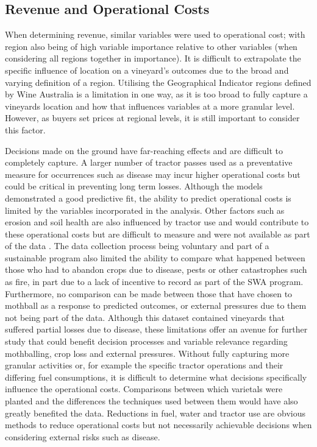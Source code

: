 \documentclass[review,12pt,authoryear]{elsarticle}
\begin{document}
\begin{linenumbers}

\subsection{Revenue and Operational Costs}

When determining revenue, similar variables were used to operational cost; with region also being of high variable importance relative to other variables (when considering all regions together in importance). It is difficult to extrapolate the specific influence of location on a vineyard's outcomes due to the broad and varying definition of a region. Utilising the Geographical Indicator regions defined by Wine Australia \citep{australiaWineAustraliaOpenData2021} is a limitation in one way, as it is too broad to fully capture a vineyards location and how that influences variables at a more granular level. However, as buyers set prices at regional levels, it is still important to consider this factor. 
\par
Decisions made on the ground have far-reaching effects and are difficult to completely capture. A larger number of tractor passes used as a preventative measure for occurrences such as disease may incur higher operational costs but could be critical in preventing long term losses. Although the models demonstrated a good predictive fit, the ability to predict operational costs is limited by the variables incorporated in the analysis. Other factors such as erosion and soil health are also influenced by tractor use and would contribute to these operational costs but are difficult to measure and were not available as part of the data \citep{capelloEffectsTractorPasses2019,capelloPermanentCoverSoil2020}. The data collection process being voluntary and part of a sustainable program also limited the ability to compare what happened between those who had to abandon crops due to disease, pests or other catastrophes such as fire, in part due to a lack of incentive to record as part of the SWA program. Furthermore, no comparison can be made between those that have chosen to mothball as a response to predicted outcomes, or external pressures due to them not being part of the data. Although this dataset contained vineyards that suffered partial losses due to disease, these limitations offer an avenue for further study that could benefit decision processes and variable relevance regarding mothballing, crop loss and external pressures. Without fully capturing more granular activities or, for example the specific tractor operations and their differing fuel consumptions, it is difficult to determine what decisions specifically influence the operational costs. Comparisons between which varietals were planted and the differences the techniques used between them would have also greatly benefited the data. Reductions in fuel, water and tractor use are obvious methods to reduce operational costs but not necessarily achievable decisions when considering external risks such as disease.

\end{linenumbers}
\end{document}
